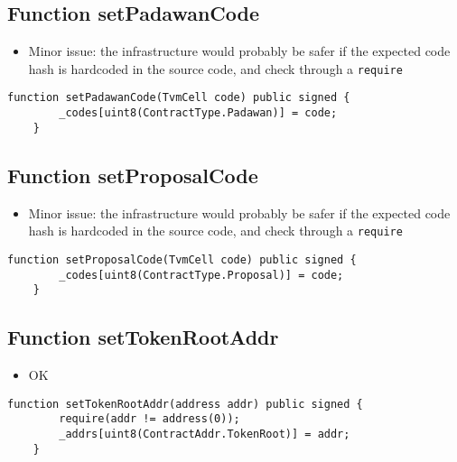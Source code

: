 \subsection{Function setPadawanCode}

\begin{itemize}
\item Minor issue: the infrastructure would probably be safer if the
  expected code hash is hardcoded in the source code, and check
  through a {\tt require}
\end{itemize}

\begin{lstlisting}[firstnumber=14]
    function setPadawanCode(TvmCell code) public signed {
        _codes[uint8(ContractType.Padawan)] = code;
    }
\end{lstlisting}

\subsection{Function setProposalCode}

\begin{itemize}
\item Minor issue: the infrastructure would probably be safer if the
  expected code hash is hardcoded in the source code, and check
  through a {\tt require}
\end{itemize}

\begin{lstlisting}[firstnumber=17]
    function setProposalCode(TvmCell code) public signed {
        _codes[uint8(ContractType.Proposal)] = code;
    }
\end{lstlisting}

\subsection{Function setTokenRootAddr}

\begin{itemize}
\item OK
\end{itemize}

\begin{lstlisting}[firstnumber=25]
    function setTokenRootAddr(address addr) public signed {
        require(addr != address(0));
        _addrs[uint8(ContractAddr.TokenRoot)] = addr;
    }
\end{lstlisting}
